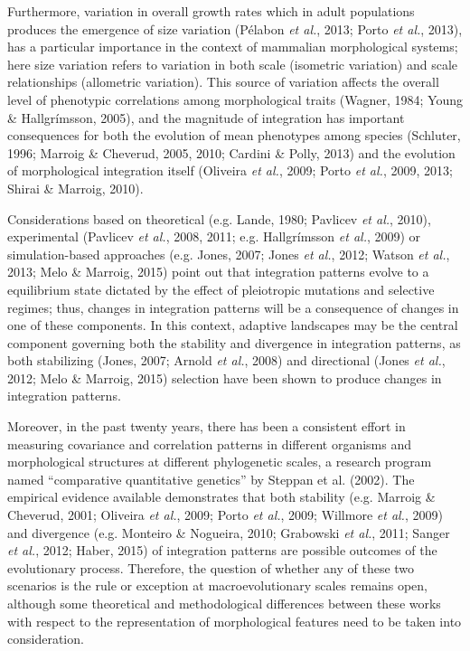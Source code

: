 \documentclass[12pt,twoside]{report}
\begin{document}
Furthermore, variation in overall growth rates which in adult
populations produces the emergence of size variation (Pélabon \emph{et
al.}, 2013; Porto \emph{et al.}, 2013), has a particular importance in
the context of mammalian morphological systems; here size variation
refers to variation in both scale (isometric variation) and scale
relationships (allometric variation). This source of variation affects
the overall level of phenotypic correlations among morphological traits
(Wagner, 1984; Young \& Hallgrímsson, 2005), and the magnitude of
integration has important consequences for both the evolution of mean
phenotypes among species (Schluter, 1996; Marroig \& Cheverud, 2005,
2010; Cardini \& Polly, 2013) and the evolution of morphological
integration itself (Oliveira \emph{et al.}, 2009; Porto \emph{et al.},
2009, 2013; Shirai \& Marroig, 2010).

Considerations based on theoretical (e.g. Lande, 1980; Pavlicev \emph{et
al.}, 2010), experimental (Pavlicev \emph{et al.}, 2008, 2011; e.g.
Hallgrímsson \emph{et al.}, 2009) or simulation-based approaches (e.g.
Jones, 2007; Jones \emph{et al.}, 2012; Watson \emph{et al.}, 2013; Melo
\& Marroig, 2015) point out that integration patterns evolve to a
equilibrium state dictated by the effect of pleiotropic mutations and
selective regimes; thus, changes in integration patterns will be a
consequence of changes in one of these components. In this context,
adaptive landscapes may be the central component governing both the
stability and divergence in integration patterns, as both stabilizing
(Jones, 2007; Arnold \emph{et al.}, 2008) and directional (Jones
\emph{et al.}, 2012; Melo \& Marroig, 2015) selection have been shown to
produce changes in integration patterns.

Moreover, in the past twenty years, there has been a consistent effort
in measuring covariance and correlation patterns in different organisms
and morphological structures at different phylogenetic scales, a
research program named ``comparative quantitative genetics'' by Steppan
et al. (2002). The empirical evidence available demonstrates that both
stability (e.g. Marroig \& Cheverud, 2001; Oliveira \emph{et al.}, 2009;
Porto \emph{et al.}, 2009; Willmore \emph{et al.}, 2009) and divergence
(e.g. Monteiro \& Nogueira, 2010; Grabowski \emph{et al.}, 2011; Sanger
\emph{et al.}, 2012; Haber, 2015) of integration patterns are possible
outcomes of the evolutionary process. Therefore, the question of whether
any of these two scenarios is the rule or exception at macroevolutionary
scales remains open, although some theoretical and methodological
differences between these works with respect to the representation of
morphological features need to be taken into consideration.
\end{document}
